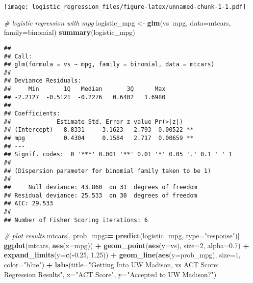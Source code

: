 \documentclass[]{article}
\newenvironment{Shaded}{\begin{snugshade}}{\end{snugshade}}
\newcommand{\KeywordTok}[1]{\textcolor[rgb]{0.13,0.29,0.53}{\textbf{#1}}}
\newcommand{\DataTypeTok}[1]{\textcolor[rgb]{0.13,0.29,0.53}{#1}}
\newcommand{\DecValTok}[1]{\textcolor[rgb]{0.00,0.00,0.81}{#1}}
\newcommand{\FloatTok}[1]{\textcolor[rgb]{0.00,0.00,0.81}{#1}}
\newcommand{\StringTok}[1]{\textcolor[rgb]{0.31,0.60,0.02}{#1}}
\newcommand{\CommentTok}[1]{\textcolor[rgb]{0.56,0.35,0.01}{\textit{#1}}}
\newcommand{\OperatorTok}[1]{\textcolor[rgb]{0.81,0.36,0.00}{\textbf{#1}}}
\newcommand{\ErrorTok}[1]{\textcolor[rgb]{0.64,0.00,0.00}{\textbf{#1}}}
\newcommand{\NormalTok}[1]{#1}
\begin{document}
\texttt{[image: logistic\_regression\_files/figure-latex/unnamed-chunk-1-1.pdf]}

\begin{Shaded}
\begin{Highlighting}[]
\CommentTok{# logistic regression with mpg}
\NormalTok{logistic_mpg <-}\StringTok{ }\KeywordTok{glm}\NormalTok{(vs}\OperatorTok{~}\NormalTok{mpg, }\DataTypeTok{data=}\NormalTok{mtcars, }\DataTypeTok{family=}\NormalTok{binomial)}
\KeywordTok{summary}\NormalTok{(logistic_mpg)}
\end{Highlighting}
\end{Shaded}

\begin{verbatim}
## 
## Call:
## glm(formula = vs ~ mpg, family = binomial, data = mtcars)
## 
## Deviance Residuals: 
##     Min       1Q   Median       3Q      Max  
## -2.2127  -0.5121  -0.2276   0.6402   1.6980  
## 
## Coefficients:
##             Estimate Std. Error z value Pr(>|z|)   
## (Intercept)  -8.8331     3.1623  -2.793  0.00522 **
## mpg           0.4304     0.1584   2.717  0.00659 **
## ---
## Signif. codes:  0 '***' 0.001 '**' 0.01 '*' 0.05 '.' 0.1 ' ' 1
## 
## (Dispersion parameter for binomial family taken to be 1)
## 
##     Null deviance: 43.860  on 31  degrees of freedom
## Residual deviance: 25.533  on 30  degrees of freedom
## AIC: 29.533
## 
## Number of Fisher Scoring iterations: 6
\end{verbatim}

\begin{Shaded}
\begin{Highlighting}[]
\CommentTok{# plot results }
\NormalTok{mtcars[, prob_mpg}\OperatorTok{:}\ErrorTok{=}\StringTok{ }\KeywordTok{predict}\NormalTok{(logistic_mpg, }\DataTypeTok{type=}\StringTok{"response"}\NormalTok{)]}
\KeywordTok{ggplot}\NormalTok{(mtcars, }\KeywordTok{aes}\NormalTok{(}\DataTypeTok{x=}\NormalTok{mpg)) }\OperatorTok{+}
\StringTok{  }\KeywordTok{geom_point}\NormalTok{(}\KeywordTok{aes}\NormalTok{(}\DataTypeTok{y=}\NormalTok{vs), }\DataTypeTok{size=}\DecValTok{2}\NormalTok{, }\DataTypeTok{alpha=}\FloatTok{0.7}\NormalTok{) }\OperatorTok{+}
\StringTok{  }\KeywordTok{expand_limits}\NormalTok{(}\DataTypeTok{y=}\KeywordTok{c}\NormalTok{(}\OperatorTok{-}\FloatTok{0.25}\NormalTok{, }\FloatTok{1.25}\NormalTok{)) }\OperatorTok{+}
\StringTok{  }\KeywordTok{geom_line}\NormalTok{(}\KeywordTok{aes}\NormalTok{(}\DataTypeTok{y=}\NormalTok{prob_mpg), }\DataTypeTok{size=}\DecValTok{1}\NormalTok{, }\DataTypeTok{color=}\StringTok{"blue"}\NormalTok{) }\OperatorTok{+}
\StringTok{  }\KeywordTok{labs}\NormalTok{(}\DataTypeTok{title=}\StringTok{"Getting Into UW Madison, vs ACT Score: Regression Results"}\NormalTok{,}
       \DataTypeTok{x=}\StringTok{"ACT Score"}\NormalTok{,}
       \DataTypeTok{y=}\StringTok{"Accepted to UW Madison?"}\NormalTok{)}
\end{Highlighting}
\end{Shaded}
\end{document}
